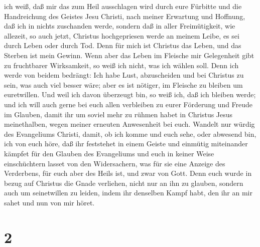 ich weiß, daß mir das zum Heil ausschlagen wird durch eure Fürbitte und
die Handreichung des Geistes Jesu Christi,  nach meiner
Erwartung und Hoffnung, daß ich in nichts zuschanden werde, sondern daß
in aller Freimütigkeit, wie allezeit, so auch jetzt, Christus
hochgepriesen werde an meinem Leibe, es sei durch Leben oder durch Tod.
 Denn für mich ist Christus das Leben, und das Sterben
ist mein Gewinn.  Wenn aber das Leben im Fleische mir
Gelegenheit gibt zu fruchtbarer Wirksamkeit, so weiß ich nicht, was ich
wählen soll.  Denn ich werde von beidem bedrängt: Ich
habe Lust, abzuscheiden und bei Christus zu sein, was auch viel besser
wäre;  aber es ist nötiger, im Fleische zu bleiben um
euretwillen.  Und weil ich davon überzeugt bin, so weiß
ich, daß ich bleiben werde; und ich will auch gerne bei euch allen
verbleiben zu eurer Förderung und Freude im Glauben, 
damit ihr um soviel mehr zu rühmen habet in Christus Jesus meinethalben,
wegen meiner erneuten Anwesenheit bei euch.  Wandelt nur
würdig des Evangeliums Christi, damit, ob ich komme und euch sehe, oder
abwesend bin, ich von euch höre, daß ihr feststehet in einem Geiste und
einmütig miteinander kämpfet für den Glauben des Evangeliums
 und euch in keiner Weise einschüchtern lasset von den
Widersachern, was für sie eine Anzeige des Verderbens, für euch aber des
Heils ist, und zwar von Gott.  Denn euch wurde in bezug
auf Christus die Gnade verliehen, nicht nur an ihn zu glauben, sondern
auch um seinetwillen zu leiden,  indem ihr denselben
Kampf habt, den ihr an mir sahet und nun von mir höret.

\hypertarget{section-1}{%
\section{2}\label{section-1}}

